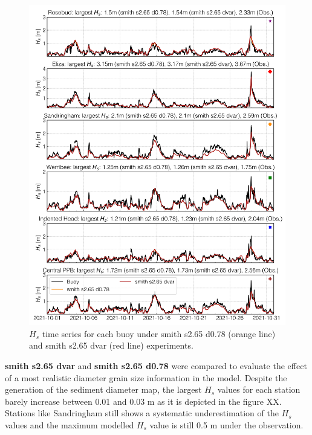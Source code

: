 \documentclass[12pt]{article}
\begin{document}
\begin{figure}[h]
    \centering
    \includegraphics[scale=0.7]{plots/hs_series/smith s2.65 d0.78_vs_smith s2.65 dvar_vert.png}
    \caption{$H_{s}$ time series for each buoy under smith s2.65 d0.78 (orange line) and smith s2.65 dvar (red line) experiments.}
    \label{fig:hs_smith_0.78_vs_smith_dvar}
\end{figure}

\textbf{smith s2.65 dvar} and \textbf{smith s2.65 d0.78} were compared to evaluate the effect of a most realistic diameter grain size information in the model. Despite the generation of the sediment diameter map, the largest $H_s$ values for each station barely increase between 0.01 and 0.03 m as it is depicted in the figure XX. Stations like Sandringham still shows a systematic underestimation of the $H_s$ values and the maximum modelled $H_s$ value is still 0.5 m under the observation. 
\end{document}

